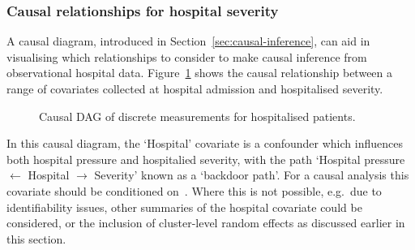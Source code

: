 \subsubsection{Causal relationships for hospital severity}

A causal diagram, introduced in Section~\ref{sec:causal-inference}, can aid in visualising which relationships to consider to make causal inference from observational hospital data. Figure~\ref{fig:hosp-dag} shows the causal relationship between a range of covariates collected at hospital admission and hospitalised severity.

\begin{figure}[htbp!]
  \centering
  \caption[Causal DAG of discrete measurements for hospitalised patients]{Causal DAG of discrete measurements for hospitalised patients.}\label{fig:hosp-dag}
\end{figure}

In this causal diagram, the `Hospital' covariate is a confounder which influences both hospital pressure and hospitalied severity, with the path `Hospital pressure $\leftarrow$ Hospital $\rightarrow$ Severity' known as a `backdoor path'. For a causal analysis this covariate should be conditioned on~\parencite{Hernan2023-de}. Where this is not possible, e.g.\ due to identifiability issues, other summaries of the hospital covariate could be considered, or the inclusion of cluster-level random effects as discussed earlier in this section.

